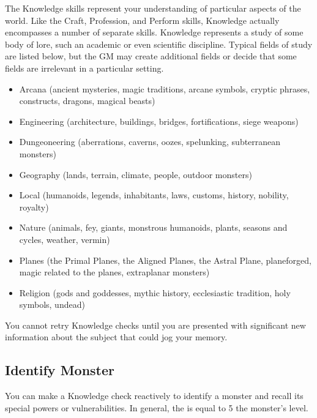 \newpage
{}
    The Knowledge skills represent your understanding of particular aspects of the world.
    Like the Craft, Profession, and Perform skills, Knowledge actually encompasses a number of separate skills.
    Knowledge represents a study of some body of lore, such an academic or even scientific discipline.
    Typical fields of study are listed below, but the GM may create additional fields or decide that some fields are irrelevant in a particular setting.
        \begin{itemize}
            \item Arcana (ancient mysteries, magic traditions, arcane symbols,
                cryptic phrases, constructs, dragons, magical beasts)
            \item Engineering (architecture, buildings, bridges, fortifications, siege weapons)
            \item Dungeoneering (aberrations, caverns, oozes, spelunking, subterranean monsters)
            \item Geography (lands, terrain, climate, people, outdoor monsters)
            \item Local (humanoids, legends, inhabitants, laws, customs, history, nobility, royalty)
            \item Nature (animals, fey, giants, monstrous humanoids, plants, seasons and cycles, weather, vermin)
            \item Planes (the Primal Planes, the Aligned Planes, the Astral Plane,
                planeforged, magic related to the planes, extraplanar monsters)
            \item Religion (gods and goddesses, mythic history, ecclesiastic tradition, holy symbols, undead)
        \end{itemize}

        You cannot retry Knowledge checks until you are presented with significant new information about the subject that could jog your memory.

    \subsection{Identify Monster}
        You can make a Knowledge check reactively to identify a monster and recall its special powers or vulnerabilities.
        In general, the  is equal to 5 \add the monster's level.

